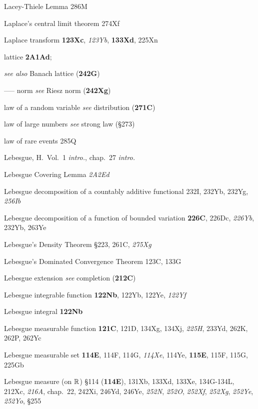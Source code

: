 



\indexmedskip

Lacey-Thiele Lemma 286M


Laplace's central limit theorem 274Xf


Laplace transform {\bf 123Xc}, {\it 123Yb}, {\bf 133Xd},
  225Xn










lattice {\bf 2A1Ad}; 

  {\it see also}
Banach lattice ({\bf 242G})




----- norm {\it see} Riesz norm ({\bf 242Xg})




law of a random variable {\it see} distribution ({\bf 271C})


law of large numbers {\it see} strong law (\S273)


law of rare events 285Q




Lebesgue, H.\   Vol.\ 1 {\it intro.}, chap.\ 27 {\it intro.}

Lebesgue Covering Lemma {\it 2A2Ed}


Lebesgue decomposition of a countably additive functional 232I, 232Yb, 232Yg,
{\it 256Ib}


Lebesgue decomposition of a function of bounded variation {\bf
226C}, 226Dc, {\it 226Yb}, 232Yb, 263Ye




Lebesgue's Density Theorem \S223, 261C, {\it 275Xg}


Lebesgue's Dominated Convergence Theorem 123C, 133G

Lebesgue extension {\it see} completion ({\bf 212C})


Lebesgue integrable function {\bf 122Nb}, 122Yb, 122Ye, {\it
122Yf}

Lebesgue integral {\bf 122Nb}

Lebesgue measurable function {\bf 121C}, 121D, 134Xg, 134Xj,
  {\it 225H}, 233Yd, 262K, 262P, 262Yc
  

Lebesgue measurable set {\bf 114E}, 114F, 114G, {\it 114Xe}, 114Ye, {\bf
115E}, 115F, 115G, 225Gb

Lebesgue measure (on $\Bbb R$) \S114 ({\bf 114E}), 131Xb, 133Xd, 133Xe,
134G-134L, 
  212Xc, {\it 216A}, chap.\ 22, 242Xi, 246Yd, 246Ye,
{\it 252N}, {\it 252O},
{\it 252Xf}, {\it 252Xg}, {\it 252Ye}, {\it 252Yo}, \S255



